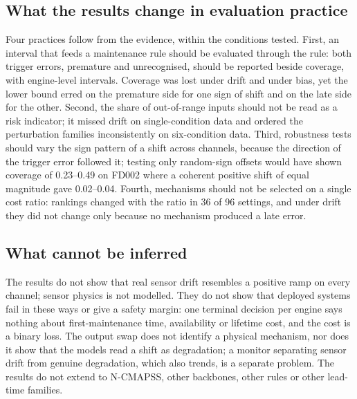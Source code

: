 \documentclass[11pt,a4paper]{article}
\newcommand{\NBiasEqL}{0.49}
\newcommand{\NBiasEqT}{0.23}
\newcommand{\JRevTotal}{36}
\newcommand{\JRevGroups}{96}
\newcommand{\JCohPosPICPFDtwo}{0.02--0.04}
\begin{document}
\subsection{What the results change in evaluation practice}
Four practices follow from the evidence, within the conditions tested. First, an interval that feeds a maintenance rule should be evaluated through the rule: both trigger errors, premature and unrecognised, should be reported beside coverage, with engine-level intervals. Coverage was lost under drift and under bias, yet the lower bound erred on the premature side for one sign of shift and on the late side for the other. Second, the share of out-of-range inputs should not be read as a risk indicator; it missed drift on single-condition data and ordered the perturbation families inconsistently on six-condition data. Third, robustness tests should vary the sign pattern of a shift across channels, because the direction of the trigger error followed it; testing only random-sign offsets would have shown coverage of \NBiasEqT--\NBiasEqL{} on FD002 where a coherent positive shift of equal magnitude gave \JCohPosPICPFDtwo. Fourth, mechanisms should not be selected on a single cost ratio: rankings changed with the ratio in \JRevTotal{} of \JRevGroups{} settings, and under drift they did not change only because no mechanism produced a late error.

\subsection{What cannot be inferred}
The results do not show that real sensor drift resembles a positive ramp on every channel; sensor physics is not modelled. They do not show that deployed systems fail in these ways or give a safety margin: one terminal decision per engine says nothing about first-maintenance time, availability or lifetime cost, and the cost is a binary loss. The output swap does not identify a physical mechanism, nor does it show that the models read a shift as degradation; a monitor separating sensor drift from genuine degradation, which also trends, is a separate problem. The results do not extend to N-CMAPSS, other backbones, other rules or other lead-time families.
\end{document}
